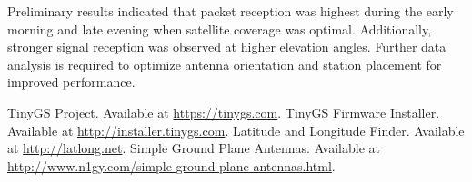 \documentclass{article}
\begin{document}
Preliminary results indicated that packet reception was highest during the early morning and late evening when satellite coverage was optimal. Additionally, stronger signal reception was observed at higher elevation angles. Further data analysis is required to optimize antenna orientation and station placement for improved performance.


\begin{thebibliography}{1}
     TinyGS Project. Available at \url{https://tinygs.com}.
     TinyGS Firmware Installer. Available at \url{http://installer.tinygs.com}.
     Latitude and Longitude Finder. Available at \url{http://latlong.net}.
     Simple Ground Plane Antennas. Available at \url{http://www.n1gy.com/simple-ground-plane-antennas.html}.
\end{thebibliography}
\end{document}
